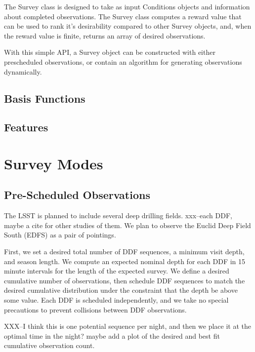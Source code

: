 \documentclass[]{aastex631}
\begin{document}
The Survey class is designed to take as input Conditions objects and information about completed observations. The Survey class computes a reward value that can be used to rank it's desirability compared to other Survey objects, and, when the reward value is finite, returns an array of desired observations.

With this simple API, a Survey object can be constructed with either prescheduled observations, or contain an algorithm for generating observations dynamically.

\subsection{Basis Functions}

\subsection{Features}



\section{Survey Modes}

\subsection{Pre-Scheduled Observations}
The LSST is planned to include several deep drilling fields. xxx--each DDF, maybe a cite for other studies of them. We plan to observe the Euclid Deep Field South (EDFS) as a pair of pointings. 

First, we set a desired total number of DDF sequences, a minimum visit depth, and season length. We compute an expected nominal depth for each DDF in 15 minute intervals for the length of the expected survey. We define a desired cumulative number of observations, then schedule DDF sequences to match the desired cumulative distribution under the constraint that the depth be above some value. Each DDF is scheduled independently, and we take no special precautions to prevent collisions between DDF observations. 

XXX--I think this is one potential sequence per night, and then we place it at the optimal time in the night? maybe add a plot of the desired and best fit cumulative observation count.
\end{document}
